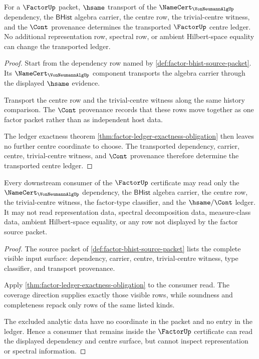\begin{theorem}
\label{thm:factor-center-ledger-transport-determinacy}
For a $\FactorUp$ packet, $\hsame$ transport of the
$\NameCert_{\VonNeumannAlgUp}$ dependency, the $\mathsf{BHist}$ algebra carrier,
the centre row, the trivial-centre witness, and the $\Cont$ provenance
determines the transported $\FactorUp$ centre ledger. No additional
representation row, spectral row, or ambient Hilbert-space equality can change
the transported ledger.
\end{theorem}
\begin{proof}
Start from the dependency row named by
\autoref{def:factor-bhist-source-packet}. Its $\NameCert_{\VonNeumannAlgUp}$
component transports the algebra carrier through the displayed $\hsame$ evidence.

Transport the centre row and the trivial-centre witness along the same history
comparison. The $\Cont$ provenance records that these rows move together as one
factor packet rather than as independent host data.

The ledger exactness theorem
\autoref{thm:factor-ledger-exactness-obligation} then leaves no further centre
coordinate to choose. The transported dependency, carrier, centre,
trivial-centre witness, and $\Cont$ provenance therefore determine the
transported centre ledger.
\end{proof}

\begin{theorem}
\label{thm:factor-vonneumann-dependency-consumer-boundary}
Every downstream consumer of the $\FactorUp$ certificate may read only the
$\NameCert_{\VonNeumannAlgUp}$ dependency, the $\mathsf{BHist}$ algebra carrier,
the centre row, the trivial-centre witness, the factor-type classifier, and the
$\hsame/\Cont$ ledger. It may not read representation data, spectral
decomposition data, measure-class data, ambient Hilbert-space equality, or any
row not displayed by the factor source packet.
\end{theorem}
\begin{proof}
The source packet of \autoref{def:factor-bhist-source-packet} lists the complete
visible input surface: dependency, carrier, centre, trivial-centre witness, type
classifier, and transport provenance.

Apply \autoref{thm:factor-ledger-exactness-obligation} to the consumer read. The
coverage direction supplies exactly those visible rows, while soundness and
completeness repack only rows of the same listed kinds.

The excluded analytic data have no coordinate in the packet and no entry in the
ledger. Hence a consumer that remains inside the $\FactorUp$ certificate can read
the displayed dependency and centre surface, but cannot inspect representation
or spectral information.
\end{proof}

